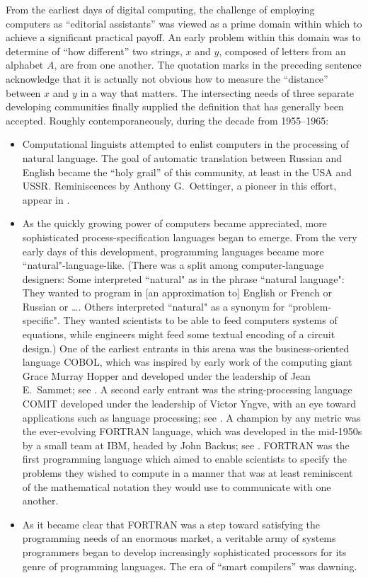 From the earliest days of digital computing, the challenge of employing computers as ``editorial assistants'' was viewed as a prime domain within which to achieve a significant practical payoff.  An early problem within this domain was to determine of ``how different'' two strings, $x$ and $y$, composed of letters from an alphabet $A$, are from one another.  The quotation marks in the preceding sentence acknowledge that it is actually not obvious how to measure the ``distance'' between $x$ and $y$ in a way that matters.  The intersecting needs of three separate developing communities finally supplied the definition that has generally been accepted.  Roughly contemporaneously, during the decade from 1955--1965:
  
 
  \begin{itemize}
  \item
Computational linguists attempted to enlist computers in the processing of natural language.  The goal of automatic translation between Russian and English became the ``holy grail'' of this community, at least in the USA and USSR.  Reminiscences by Anthony G.~Oettinger,  a pioneer in this effort, appear in \cite{Hutchins00}.
   \medskip\item
As the quickly growing power of computers became appreciated, more sophisticated process-specification languages began to emerge.  From the very early days of this development, programming languages became more ``natural"-language-like.  (There was a split among computer-language designers:  Some interpreted ``natural" as in the phrase ``natural language":  They wanted to program in [an approximation to] English or French or Russian or \ldots.  Others interpreted ``natural" as a synonym for ``problem-specific".  They wanted scientists to be able to feed computers systems of equations, while engineers might feed some textual encoding of a circuit design.) One of the earliest entrants in this arena was the business-oriented language COBOL, which was inspired by early work of the computing giant Grace Murray Hopper and developed under the leadership of Jean E.~Sammet; see \cite{Sammet78}.  A second early entrant was the string-processing language COMIT developed under the leadership of Victor Yngve, with an eye toward applications such as language processing; see \cite{Yngve}.  A champion by any metric was the ever-evolving FORTRAN language, which was developed in the mid-1950s by a small team at IBM, headed by John Backus; see \cite{Backus-etal57}.  FORTRAN was the first programming language which aimed to enable scientists to specify the problems they wished to compute in a manner that was at least reminiscent of the mathematical notation they would use to communicate with one another.
   \medskip\item
As it became clear that FORTRAN was a step toward satisfying the programming needs of an enormous market, a veritable army of systems programmers began to develop increasingly sophisticated processors for its genre of programming languages.  The era of ``smart compilers'' was dawning.
   \end{itemize}

